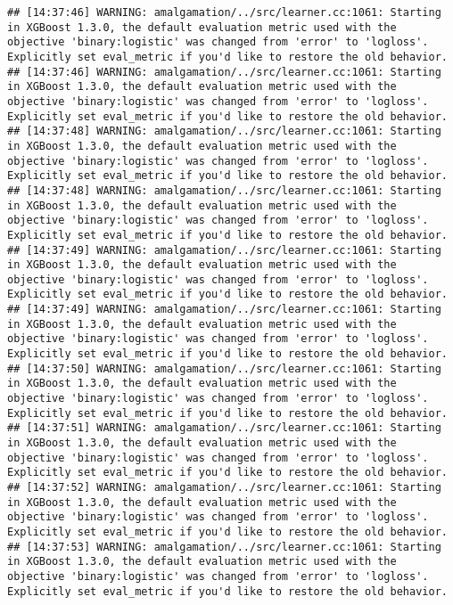 \documentclass[
]{book}
\begin{document}
\begin{verbatim}
## [14:37:46] WARNING: amalgamation/../src/learner.cc:1061: Starting in XGBoost 1.3.0, the default evaluation metric used with the objective 'binary:logistic' was changed from 'error' to 'logloss'. Explicitly set eval_metric if you'd like to restore the old behavior.
## [14:37:46] WARNING: amalgamation/../src/learner.cc:1061: Starting in XGBoost 1.3.0, the default evaluation metric used with the objective 'binary:logistic' was changed from 'error' to 'logloss'. Explicitly set eval_metric if you'd like to restore the old behavior.
## [14:37:48] WARNING: amalgamation/../src/learner.cc:1061: Starting in XGBoost 1.3.0, the default evaluation metric used with the objective 'binary:logistic' was changed from 'error' to 'logloss'. Explicitly set eval_metric if you'd like to restore the old behavior.
## [14:37:48] WARNING: amalgamation/../src/learner.cc:1061: Starting in XGBoost 1.3.0, the default evaluation metric used with the objective 'binary:logistic' was changed from 'error' to 'logloss'. Explicitly set eval_metric if you'd like to restore the old behavior.
## [14:37:49] WARNING: amalgamation/../src/learner.cc:1061: Starting in XGBoost 1.3.0, the default evaluation metric used with the objective 'binary:logistic' was changed from 'error' to 'logloss'. Explicitly set eval_metric if you'd like to restore the old behavior.
## [14:37:49] WARNING: amalgamation/../src/learner.cc:1061: Starting in XGBoost 1.3.0, the default evaluation metric used with the objective 'binary:logistic' was changed from 'error' to 'logloss'. Explicitly set eval_metric if you'd like to restore the old behavior.
## [14:37:50] WARNING: amalgamation/../src/learner.cc:1061: Starting in XGBoost 1.3.0, the default evaluation metric used with the objective 'binary:logistic' was changed from 'error' to 'logloss'. Explicitly set eval_metric if you'd like to restore the old behavior.
## [14:37:51] WARNING: amalgamation/../src/learner.cc:1061: Starting in XGBoost 1.3.0, the default evaluation metric used with the objective 'binary:logistic' was changed from 'error' to 'logloss'. Explicitly set eval_metric if you'd like to restore the old behavior.
## [14:37:52] WARNING: amalgamation/../src/learner.cc:1061: Starting in XGBoost 1.3.0, the default evaluation metric used with the objective 'binary:logistic' was changed from 'error' to 'logloss'. Explicitly set eval_metric if you'd like to restore the old behavior.
## [14:37:53] WARNING: amalgamation/../src/learner.cc:1061: Starting in XGBoost 1.3.0, the default evaluation metric used with the objective 'binary:logistic' was changed from 'error' to 'logloss'. Explicitly set eval_metric if you'd like to restore the old behavior.

\end{verbatim}
\end{document}
